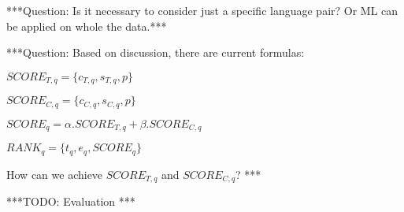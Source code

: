 ***Question: Is it necessary to consider just a specific language pair? Or ML can be applied on whole the data.***

***Question: Based on discussion, there are current formulas:
\begin{center}
$SCORE_{T,q} = \{ c_{T,q}, s_{T,q}, p \}$ \\
\end{center}
\begin{center}
$SCORE_{C,q} = \{ c_{C,q}, s_{C,q}, p \}$ \\
\end{center}
\begin{center}
$SCORE_{q} = \alpha.SCORE_{T,q} + \beta.SCORE_{C,q}$ \\
\end{center}
\begin{center}
$RANK_{q} = \{ t_q, e _q, SCORE_q \}$ \\
\end{center}

How can we achieve $SCORE_{T,q}$ and $SCORE_{C,q}$?
***

***TODO: Evaluation ***